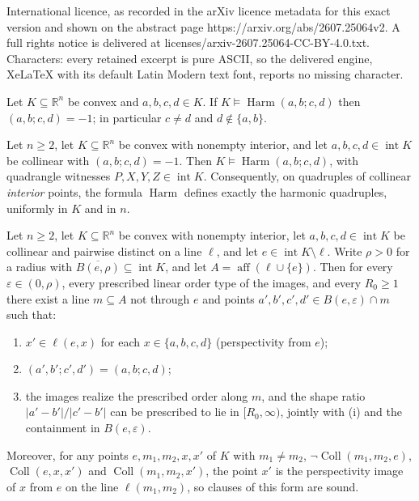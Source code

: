 \documentclass[10pt,a4paper]{amsart}
\newcommand{\Coll}{\operatorname{Coll}}
\newcommand{\Harm}{\operatorname{Harm}}
\newcommand{\R}{\mathbb{R}}
\newcommand{\aff}{\operatorname{aff}}
\newcommand{\interior}{\operatorname{int}}
\begin{document}
International licence, as recorded in the arXiv licence metadata for this exact version and shown on the abstract page https://arxiv.org/abs/2607.25064v2. A full rights notice is delivered at licenses/arxiv-2607.25064-CC-BY-4.0.txt. Characters: every retained excerpt is pure ASCII, so the delivered engine, XeLaTeX with its default Latin Modern text font, reports no missing character.
\begin{lemma}[Soundness]\label{lem:harm-sound}
Let $K\subseteq\R^n$ be convex and $a,b,c,d\in K$. If
$K\models\Harm(a,b;c,d)$ then $(a,b;c,d)=-1$; in particular $c\ne d$ and
$d\notin\{a,b\}$.
\end{lemma}

\begin{theorem}\label{thm:harmonic}
Let $n\ge2$, let $K\subseteq\R^n$ be convex with nonempty interior, and let
$a,b,c,d\in\interior K$ be collinear with $(a,b;c,d)=-1$. Then
$K\models\Harm(a,b;c,d)$, with quadrangle witnesses
$P,X,Y,Z\in\interior K$. Consequently, on quadruples of collinear
\emph{interior} points, the formula $\Harm$ defines exactly the harmonic
quadruples, uniformly in $K$ and in $n$.
\end{theorem}

\begin{lemma}
\label{lem:transport}
Let $n\ge2$, let $K\subseteq\R^n$ be convex with nonempty interior, let
$a,b,c,d\in\interior K$ be collinear and pairwise distinct on a line $\ell$,
and let $e\in\interior K\setminus\ell$. Write $\rho>0$ for a radius with
$\overline{B(e,\rho)}\subseteq\interior K$, and let $A=\aff(\ell\cup\{e\})$.
Then for every $\varepsilon\in(0,\rho)$, every prescribed linear order type
of the images, and every $R_0\ge1$ there exist a line $m\subseteq A$ not
through $e$ and points $a',b',c',d'\in B(e,\varepsilon)\cap m$ such that:
\begin{enumerate}[label=\textup{(\roman*)}]
\item $x'\in\ell(e,x)$ for each $x\in\{a,b,c,d\}$ \textup(perspectivity from
$e$\textup);
\item $(a',b';c',d')=(a,b;c,d)$;
\item the images realize the prescribed order along $m$, and the shape ratio
$|a'-b'|/|c'-b'|$ can be prescribed to lie in $[R_0,\infty)$, jointly with
\textup{(i)} and the containment in $B(e,\varepsilon)$.
\end{enumerate}
Moreover, for any points $e,m_1,m_2,x,x'$ of $K$ with $m_1\ne m_2$,
$\neg\Coll(m_1,m_2,e)$, $\Coll(e,x,x')$ and $\Coll(m_1,m_2,x')$, the point
$x'$ is the perspectivity image of $x$ from $e$ on the line $\ell(m_1,m_2)$,
so clauses of this form are sound.
\end{lemma}
\end{document}
